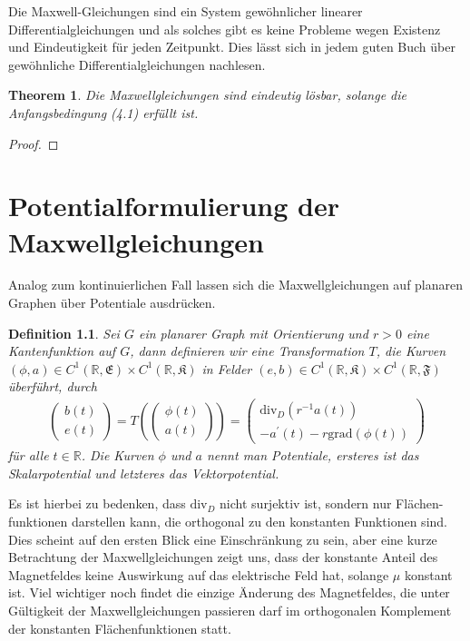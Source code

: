 \documentclass[11pt,a4paper,leqno]{report}
\newtheorem{theorem}{Theorem}[chapter]
\newtheorem{definition}[theorem]{Definition}
\numberwithin{equation}{chapter}
\begin{document}
\noindent
Die Maxwell-Gleichungen sind ein System gew\"ohnlicher linearer Differentialgleichungen und als solches gibt es keine Probleme wegen Existenz und Eindeutigkeit f\"ur jeden Zeitpunkt. Dies l\"asst sich in jedem guten Buch \"uber gew\"ohnliche Differentialgleichungen nachlesen.
\begin{theorem}
	Die Maxwellgleichungen sind eindeutig l\"osbar, solange die Anfangsbedingung (4.1) erf\"ullt ist.
\end{theorem}
\begin{proof}
\end{proof}
\chapter{Potentialformulierung der Maxwellgleichungen}
Analog zum kontinuierlichen Fall lassen sich die Maxwellgleichungen auf planaren Graphen \"uber Potentiale ausdr\"ucken. 
\begin{definition}
Sei $G$ ein planarer Graph mit Orientierung und $r>0$ eine Kantenfunktion auf $G$, dann definieren wir eine Transformation $T$,
die Kurven $(\phi, a)\in C^1(\mathbb{R},\mathfrak{E})\times C^1(\mathbb{R},\mathfrak{K})$ in Felder $(e, b)\in C^1(\mathbb{R},\mathfrak{K})\times C^1(\mathbb{R},\mathfrak{F})$ \"uberf\"uhrt, durch
	\begin{align}
		\left(
		\begin{array}{c}
		b(t)\\
		e(t)
		\end{array}
		\right)=
		T(\left(
		\begin{array}{c}
		\phi(t)\\
		a(t)
		\end{array}
		\right))=
		\left(
		\begin{array}{c}
		\text{div}_D(r^{-1}a(t))\\
		-a^\prime(t) - r\text{grad}(\phi(t))
		\end{array}
		\right)
	\end{align}
 f\"ur alle $t\in\mathbb{R}$. Die Kurven $\phi$ und $a$ nennt man Potentiale, ersteres ist das Skalarpotential und letzteres das Vektorpotential.
\end{definition}
\noindent
Es ist hierbei zu bedenken, dass $\text{div}_D$ nicht surjektiv ist, sondern nur Fl\"achen-funktionen darstellen kann, die orthogonal zu den konstanten Funktionen sind. Dies scheint auf den ersten Blick eine Einschr\"ankung zu sein, aber eine kurze Betrachtung der Maxwellgleichungen zeigt uns, dass der konstante Anteil des Magnetfeldes keine Auswirkung auf das elektrische Feld hat, solange $\mu$ konstant ist. Viel wichtiger noch findet die einzige \"Anderung des Magnetfeldes, die unter G\"ultigkeit der Maxwellgleichungen passieren darf im orthogonalen Komplement der konstanten Fl\"achenfunktionen statt.\\
\end{document}
